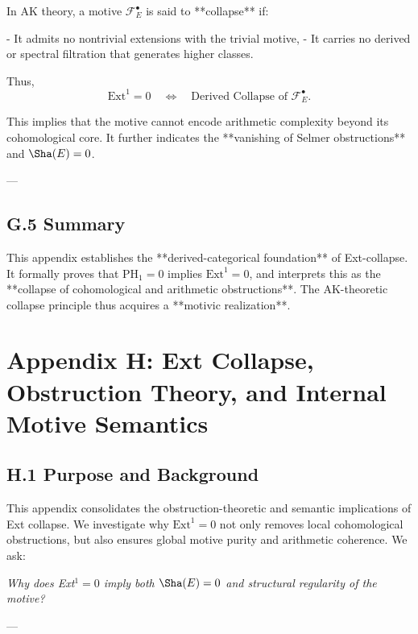 In AK theory, a motive \( \mathcal{F}_E^\bullet \) is said to **collapse** if:

- It admits no nontrivial extensions with the trivial motive,
- It carries no derived or spectral filtration that generates higher classes.

Thus,
\[
\mathrm{Ext}^1 = 0 \quad \Longleftrightarrow \quad \text{Derived Collapse of } \mathcal{F}_E^\bullet.
\]

This implies that the motive cannot encode arithmetic complexity beyond its cohomological core.  
It further indicates the **vanishing of Selmer obstructions** and \( \Sha(E) = 0 \).

---

\subsection*{G.5 Summary}

This appendix establishes the **derived-categorical foundation** of Ext-collapse.  
It formally proves that \( \mathrm{PH}_1 = 0 \) implies \( \mathrm{Ext}^1 = 0 \),  
and interprets this as the **collapse of cohomological and arithmetic obstructions**.  
The AK-theoretic collapse principle thus acquires a **motivic realization**.



\section*{Appendix H: Ext Collapse, Obstruction Theory, and Internal Motive Semantics}

\subsection*{H.1 Purpose and Background}

This appendix consolidates the obstruction-theoretic and semantic implications of Ext collapse.  
We investigate why \( \mathrm{Ext}^1 = 0 \) not only removes local cohomological obstructions, but also ensures global motive purity and arithmetic coherence.  
We ask:

\begin{center}
\textit{Why does Ext$^1 = 0$ imply both $\Sha(E) = 0$ and structural regularity of the motive?}
\end{center}

---

